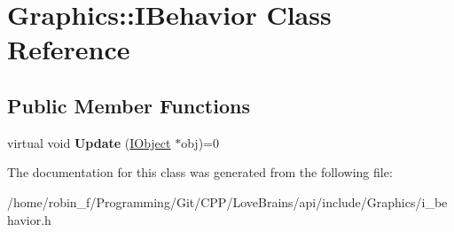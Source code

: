 \hypertarget{class_graphics_1_1_i_behavior}{}\section{Graphics\+:\+:I\+Behavior Class Reference}
\label{class_graphics_1_1_i_behavior}
\subsection*{Public Member Functions}
\begin{DoxyCompactItemize}
\item 
\hypertarget{class_graphics_1_1_i_behavior_ac341180608014d8ec54c2b775881c191}{}virtual void {\bfseries Update} (\hyperlink{class_graphics_1_1_i_object}{I\+Object} $\ast$obj)=0\label{class_graphics_1_1_i_behavior_ac341180608014d8ec54c2b775881c191}

\end{DoxyCompactItemize}


The documentation for this class was generated from the following file\+:\begin{DoxyCompactItemize}
\item 
/home/robin\+\_\+f/\+Programming/\+Git/\+C\+P\+P/\+Love\+Brains/api/include/\+Graphics/i\+\_\+behavior.\+h\end{DoxyCompactItemize}

